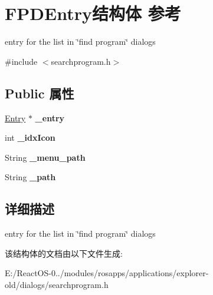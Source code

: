 \hypertarget{struct_f_p_d_entry}{}\section{F\+P\+D\+Entry结构体 参考}
\label{struct_f_p_d_entry}


entry for the list in \char`\"{}find program\char`\"{} dialogs  




{\ttfamily \#include $<$searchprogram.\+h$>$}

\subsection*{Public 属性}
\begin{DoxyCompactItemize}
\item 
\mbox{\label{struct_f_p_d_entry_ab71549ae069a7b08d723d2b8f8a24688}} 
\hyperlink{struct_entry}{Entry} $\ast$ {\bfseries \+\_\+entry}
\item 
\mbox{\label{struct_f_p_d_entry_a145a7dae85503e0fbd06b811f8bc3f92}} 
int {\bfseries \+\_\+idx\+Icon}
\item 
\mbox{\label{struct_f_p_d_entry_af7eb7dd941620f33ec3309b8b9089a37}} 
String {\bfseries \+\_\+menu\+\_\+path}
\item 
\mbox{\label{struct_f_p_d_entry_a7db397232c499fd230eee7e866388b7e}} 
String {\bfseries \+\_\+path}
\end{DoxyCompactItemize}


\subsection{详细描述}
entry for the list in \char`\"{}find program\char`\"{} dialogs 

该结构体的文档由以下文件生成\+:\begin{DoxyCompactItemize}
\item 
E\+:/\+React\+O\+S-\/0../modules/rosapps/applications/explorer-\/old/dialogs/searchprogram.\+h\end{DoxyCompactItemize}
